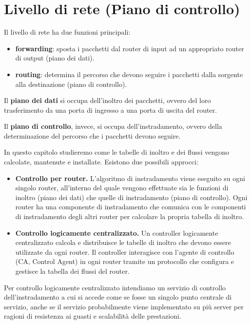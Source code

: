 \section{Livello di rete (Piano di controllo)}
Il livello di rete ha due funzioni principali:
\begin{itemize}
  \item \textbf{forwarding}: sposta i pacchetti dal router di input ad un appropriato router di output (piano dei dati).
  \item \textbf{routing}: determina il percorso che devono seguire i pacchetti dalla sorgente alla destinazione (piano di controllo).
\end{itemize}

Il \textbf{piano dei dati} si occupa dell'inoltro dei pacchetti, ovvero del loro trasferimento da una porta di ingresso a una porta di uscita del router. 

Il \textbf{piano di controllo}, invece, si occupa dell'instradamento, ovvero della determinazione del percorso che i pacchetti devono seguire. 

In questo capitolo studieremo come le tabelle di inoltro e dei flussi vengono calcolate, mantenute e installate. Esistono due possibili approcci:

\begin{itemize}
  \item \textbf{Controllo per router.} L'algoritmo di instradamento viene eseguito su ogni singolo router, all'interno del quale vengono effettuate sia le funzioni di inoltro (piano dei dati) che quelle di instradamento (piano di controllo). Ogni router ha una componente di instradamento che comunica con le componenti di instradamento degli altri router per calcolare la propria tabella di inoltro.
  \item \textbf{Controllo logicamente centralizzato.} Un controller logicamente centralizzato calcola e distribuisce le tabelle di inoltro che devono essere utilizzate da ogni router. Il controller interagisce con l'agente di controllo (CA, Control Agent) in ogni router tramite un protocollo che configura e gestisce la tabella dei flussi del router.
\end{itemize}

Per controllo logicamente centralizzato intendiamo un servizio di controllo dell'instradamento a cui si accede come se fosse un singolo punto centrale di servizio, anche se il servizio probabilmente viene implementato su più server per ragioni di resistenza ai guasti e scalabilità delle prestazioni. 

